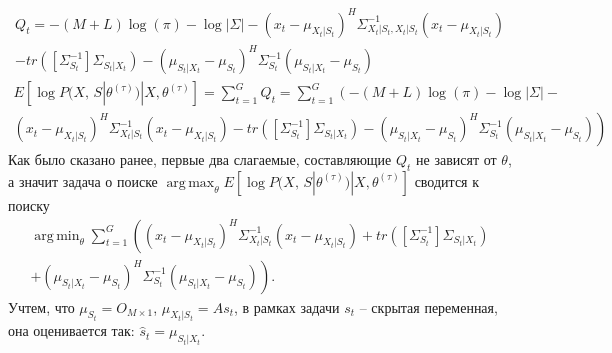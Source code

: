 \documentclass[11pt]{article}
\DeclareMathOperator*{\argmax}{arg\,max}
\DeclareMathOperator*{\argmin}{arg\,min}
\begin{document}
\begin{equation}
\begin{gathered}
Q_t = -(M+L)\log(\pi)-\log|\Sigma| - (x_t-\mu_{X_t|S_t})^H\Sigma_{X_t|S_t,X_t|S_t}^{-1}(x_t-\mu_{X_t|S_t}) \\ -  tr([\Sigma_{S_t}^{-1}]\Sigma_{S_t|X_t}) - (\mu_{S_t|X_t}-\mu_{S_t})^H\Sigma_{S_t}^{-1}(\mu_{S_t|X_t}-\mu_{S_t}) 
\end{gathered}
\end{equation}
\begin{equation}
\begin{gathered}
 E[\log P(X, \, S|\theta^{(\tau)})|X, \theta^{(\tau)}] = \sum_{t=1}^G Q_t = \sum_{t=1}^G \left(-(M+L)\log(\pi)-\log|\Sigma| - \right. \\ \left. (x_t-\mu_{X_t|S_t})^H\Sigma_{X_t|S_t}^{-1}(x_t-\mu_{X_t|S_t})  -  tr([\Sigma_{S_t}^{-1}]\Sigma_{S_t|X_t}) - (\mu_{S_t|X_t}-\mu_{S_t})^H\Sigma_{S_t}^{-1}(\mu_{S_t|X_t}-\mu_{S_t})\right)
\end{gathered}
\end{equation}
Как было сказано ранее, первые два слагаемые, составляющие $Q_t$ не зависят от $\theta$, а значит задача о поиске $\argmax_{\theta} E[\log P(X, \, S|\theta^{(\tau)})|X, \theta^{(\tau)}] $ сводится к поиску
\begin{equation}
\begin{gathered}
\argmin_{\theta}  \sum_{t=1}^G \left((x_t-\mu_{X_t|S_t})^H\Sigma_{X_t|S_t}^{-1}(x_t-\mu_{X_t|S_t}) +  tr([\Sigma_{S_t}^{-1}]\Sigma_{S_t|X_t}) \right. \\ \left. +  (\mu_{S_t|X_t}-\mu_{S_t})^H\Sigma_{S_t}^{-1}(\mu_{S_t|X_t}-\mu_{S_t})\right).
\end{gathered}
\end{equation}
Учтем, что $\mu_{S_t} = O_{M \times 1}$, $\mu_{X_t|S_t}=As_t$, в рамках задачи $s_t$ -- скрытая переменная, она оценивается так: $\hat{s}_t = \mu_{S_t|X_t}$.
\end{document}
